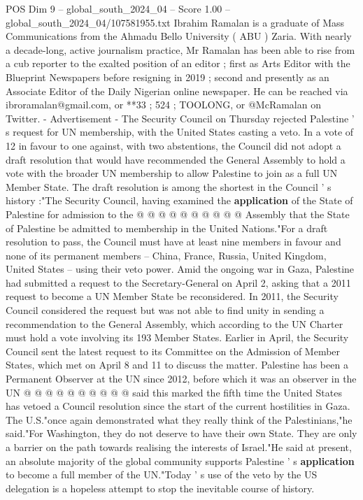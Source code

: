 \begin{textsample}{POS Dim 9 – global\_south\_2024\_04 – Score 1.00 – global\_south\_2024\_04/107581955.txt}  \label{ex:f9_pos_119}
Ibrahim Ramalan is a graduate of Mass Communications from the Ahmadu Bello University ( ABU ) Zaria.
With nearly a decade-long, active journalism practice, Mr Ramalan has been able to rise from a cub reporter to the exalted position of an editor ; first as Arts Editor with the Blueprint Newspapers before resigning in 2019 ; second and presently as an Associate Editor of the Daily Nigerian online newspaper.
He can be reached via ibroramalan@gmail.com, or **33 ; 524 ; TOOLONG, or @McRamalan on Twitter. - Advertisement - The Security Council on Thursday rejected Palestine ' s request for UN membership, with the United States casting a veto.
In a vote of 12 in favour to one against, with two abstentions, the Council did not adopt a draft resolution that would have recommended the General Assembly to hold a vote with the broader UN membership to allow Palestine to join as a full UN Member State.
The draft resolution is among the shortest in the Council ' s history :"The Security Council, having examined the \textbf{application} of the State of Palestine for admission to the @ @ @ @ @ @ @ @ @ @ Assembly that the State of Palestine be admitted to membership in the United Nations."For a draft resolution to pass, the Council must have at least nine members in favour and none of its permanent members -- China, France, Russia, United Kingdom, United States -- using their veto power.
Amid the ongoing war in Gaza, Palestine had submitted a request to the Secretary-General on April 2, asking that a 2011 request to become a UN Member State be reconsidered.
In 2011, the Security Council considered the request but was not able to find unity in sending a recommendation to the General Assembly, which according to the UN Charter must hold a vote involving its 193 Member States.
Earlier in April, the Security Council sent the latest request to its Committee on the Admission of Member States, which met on April 8 and 11 to discuss the matter.
Palestine has been a Permanent Observer at the UN since 2012, before which it was an observer in the UN @ @ @ @ @ @ @ @ @ @ said this marked the fifth time the United States has vetoed a Council resolution since the start of the current hostilities in Gaza.
The U.S."once again demonstrated what they really think of the Palestinians,"he said."For Washington, they do not deserve to have their own State.
They are only a barrier on the path towards realising the interests of Israel."He said at present, an absolute majority of the global community supports Palestine ' s \textbf{application} to become a full member of the UN."Today ' s use of the veto by the US delegation is a hopeless attempt to stop the inevitable course of history.

\end{textsample}
